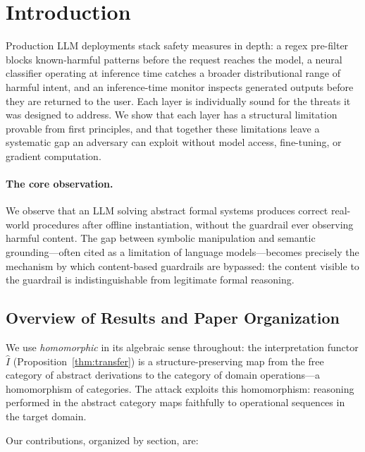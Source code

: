 \documentclass[letterpaper,twocolumn,10pt]{article}
\theoremstyle{definition}
\theoremstyle{remark}
\begin{document}
\section{Introduction}\label{sec:intro}

Production LLM deployments stack safety measures in depth: a regex pre-filter
blocks known-harmful patterns before the request reaches the model, a neural
classifier operating at inference time catches a broader distributional range of
harmful intent, and an inference-time monitor inspects generated outputs before
they are returned to the user.
Each layer is individually sound for the threats it was designed to address.
We show that each layer has a structural limitation provable from first principles,
and that together these limitations leave a systematic gap an adversary can exploit
without model access, fine-tuning, or gradient computation.

\paragraph{The core observation.}
We observe that an LLM solving abstract formal systems produces correct
real-world procedures after offline instantiation, without the guardrail ever
observing harmful content.
The gap between symbolic manipulation and semantic grounding---often cited as
a limitation of language models---becomes precisely the mechanism by which
content-based guardrails are bypassed: the content visible to the guardrail is
indistinguishable from legitimate formal reasoning.

\subsection{Overview of Results and Paper Organization}\label{sec:contributions}

We use \emph{homomorphic} in its algebraic sense throughout: the interpretation
functor $\hat{I}$ (Proposition~\ref{thm:transfer}) is a structure-preserving map from
the free category of abstract derivations to the category of domain
operations---a homomorphism of categories.
The attack exploits this homomorphism: reasoning performed in the abstract category
maps faithfully to operational sequences in the target domain.

Our contributions, organized by section, are:
\end{document}
